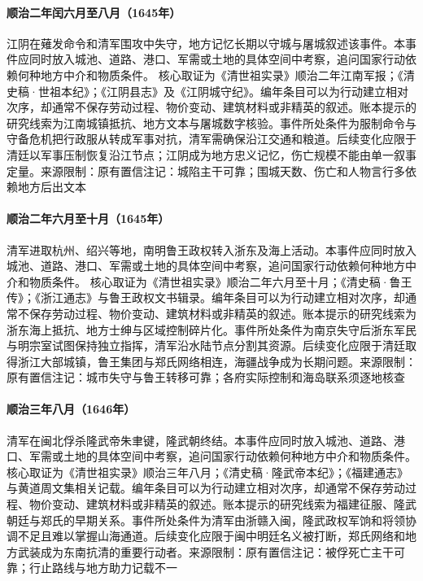 \hypertarget{civic:EQ-1645-JIANGYIN}{}\paragraph{顺治二年闰六月至八月（1645年）}江阴在薙发命令和清军围攻中失守，地方记忆长期以守城与屠城叙述该事件。本事件应同时放入城池、道路、港口、军需或土地的具体空间中考察，追问国家行动依赖何种地方中介和物质条件。 核心取证为《清世祖实录》顺治二年江南军报；《清史稿·世祖本纪》；《江阴县志》及《江阴城守纪》。编年条目可以为行动建立相对次序，却通常不保存劳动过程、物价变动、建筑材料或非精英的叙述。账本提示的研究线索为江南城镇抵抗、地方文本与屠城数字核验。事件所处条件为服制命令与守备危机把行政服从转成军事对抗，清军需确保沿江交通和粮道。后续变化应限于清廷以军事压制恢复沿江节点；江阴成为地方忠义记忆，伤亡规模不能由单一叙事定量。来源限制：原有置信注记：城陷主干可靠；围城天数、伤亡和人物言行多依赖地方后出文本
\hypertarget{civic:EQ-1645-ZHEJIANG-CONQUEST}{}\paragraph{顺治二年六月至十月（1645年）}清军进取杭州、绍兴等地，南明鲁王政权转入浙东及海上活动。本事件应同时放入城池、道路、港口、军需或土地的具体空间中考察，追问国家行动依赖何种地方中介和物质条件。 核心取证为《清世祖实录》顺治二年六月至十月；《清史稿·鲁王传》；《浙江通志》与鲁王政权文书辑录。编年条目可以为行动建立相对次序，却通常不保存劳动过程、物价变动、建筑材料或非精英的叙述。账本提示的研究线索为浙东海上抵抗、地方士绅与区域控制碎片化。事件所处条件为南京失守后浙东军民与明宗室试图保持独立指挥，清军沿水陆节点分割其资源。后续变化应限于清廷取得浙江大部城镇，鲁王集团与郑氏网络相连，海疆战争成为长期问题。来源限制：原有置信注记：城市失守与鲁王转移可靠；各府实际控制和海岛联系须逐地核查
\hypertarget{civic:EQ-1646-LONGWU-CAPTURE}{}\paragraph{顺治三年八月（1646年）}清军在闽北俘杀隆武帝朱聿键，隆武朝终结。本事件应同时放入城池、道路、港口、军需或土地的具体空间中考察，追问国家行动依赖何种地方中介和物质条件。 核心取证为《清世祖实录》顺治三年八月；《清史稿·隆武帝本纪》；《福建通志》与黄道周文集相关记载。编年条目可以为行动建立相对次序，却通常不保存劳动过程、物价变动、建筑材料或非精英的叙述。账本提示的研究线索为福建征服、隆武朝廷与郑氏的早期关系。事件所处条件为清军由浙赣入闽，隆武政权军饷和将领协调不足且难以掌握山海通道。后续变化应限于闽中明廷名义被打断，郑氏网络和地方武装成为东南抗清的重要行动者。来源限制：原有置信注记：被俘死亡主干可靠；行止路线与地方助力记载不一

